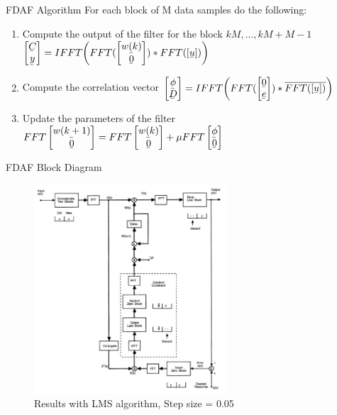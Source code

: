 \documentclass[xcolor=dvipsnames]{beamer}
\newcommand{\ubar}[1]{\underaccent{\bar}{#1}}
\begin{document}
\begin{frame}{FDAF Algorithm}
For each block of M data samples do the following:\\
\begin{enumerate}
	\item  Compute the output of the filter for the block $kM,...,kM + M − 1$
	$\begin{bmatrix}
	\ubar{C}\\ 
	\ubar{y}
	\end{bmatrix} = IFFT\bigg(FFT(\begin{bmatrix}
	\ubar{w(k)}\\ 
	\ubar{0}
	\end{bmatrix})* FFT([\ubar{u}])\bigg)$
	\item Compute the correlation vector
	$\begin{bmatrix}
	\ubar{\phi}\\ \ubar{D}
	\end{bmatrix} = IFFT\bigg( FFT(\begin{bmatrix}
	\ubar{0}\\ 
	\ubar{e}
	\end{bmatrix})*\overline{FFT([\ubar{u}])} \bigg)$
	\item Update the parameters of the filter
	$FFT\begin{bmatrix}
	\ubar{w(k+1)}\\ 
	\ubar{0}
	\end{bmatrix} = FFT\begin{bmatrix}
	\ubar{w(k)}\\ 
	\ubar{0}
	\end{bmatrix} + \mu FFT\begin{bmatrix}
	\ubar{\phi}\\ 
	\ubar{0}
	\end{bmatrix}$
\end{enumerate}
\end{frame}


\begin{frame}{FDAF Block Diagram}
	\begin{figure}
		\includegraphics[width=\textwidth, height = 7.8cm]{FDAF_Block}
		\caption{Results with LMS algorithm, Step size = 0.05}
	\end{figure}
\end{frame}
\end{document}
